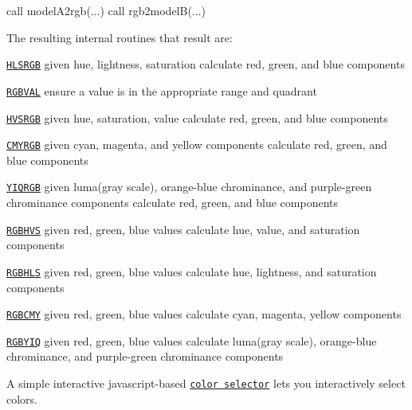 \begin{DoxyDescription}
\begin{DoxyPre}
     call modelA2rgb(...)
     call rgb2modelB(...)
 \end{DoxyPre}




The resulting internal routines that result are\+: 




\begin{DoxyItemize}
\item \href{#HLSRGB}{\tt H\+L\+S\+R\+GB} given hue, lightness, saturation calculate red, green, and blue components 
\begin{DoxyItemize}
\item \href{#RGBVAL}{\tt R\+G\+B\+V\+AL} ensure a value is in the appropriate range and quadrant  
\end{DoxyItemize}
\item \href{#HVSRGB}{\tt H\+V\+S\+R\+GB} given hue, saturation, value calculate red, green, and blue components  
\item \href{#CMYRGB}{\tt C\+M\+Y\+R\+GB} given cyan, magenta, and yellow components calculate red, green, and blue components  
\item \href{#YIQRGB}{\tt Y\+I\+Q\+R\+GB} given luma(gray scale), orange-\/blue chrominance, and purple-\/green chrominance components calculate red, green, and blue components 


\item \href{#RGBHVS}{\tt R\+G\+B\+H\+VS} given red, green, blue values calculate hue, value, and saturation components  
\item \href{#RGBHLS}{\tt R\+G\+B\+H\+LS} given red, green, blue values calculate hue, lightness, and saturation components  
\item \href{#RGBCMY}{\tt R\+G\+B\+C\+MY} given red, green, blue values calculate cyan, magenta, yellow components  
\item \href{#RGBYIQ}{\tt R\+G\+B\+Y\+IQ} given red, green, blue values calculate luma(gray scale), orange-\/blue chrominance, and purple-\/green chrominance components 


\end{DoxyItemize}


\item[S\+EE A\+L\+SO  ]



A simple interactive javascript-\/based \href{../../../public_html/javascript/color/iframe.html}{\tt color selector} lets you interactively select colors. 






\end{DoxyDescription}
